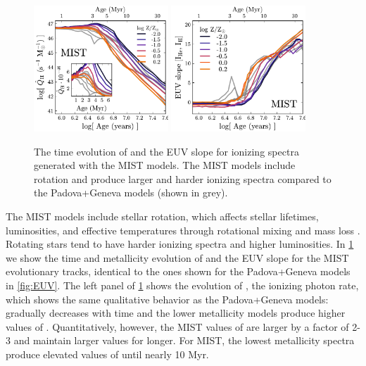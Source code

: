 \begin{figure}[!htbp]
  \begin{centering}
    \includegraphics[width=0.45\textwidth]{manuscript/chapter2/f23a.pdf}
    \includegraphics[width=0.45\textwidth]{manuscript/chapter2/f23b.pdf}
    \caption{The time evolution of \QHat{} and the EUV slope for ionizing spectra generated with the MIST models. The MIST models include rotation and produce larger \QH{} and harder ionizing spectra compared to the Padova+Geneva models (shown in grey).}
    \label{fig:Qmist}
  \end{centering}
\end{figure}

The MIST models include stellar rotation, which affects stellar lifetimes, luminosities, and effective temperatures through rotational mixing and mass loss \citep[][for further details]{Choi16}. Rotating stars tend to have harder ionizing spectra and higher luminosities. In \ref{fig:Qmist} we show the time and metallicity evolution of \QHat{} and the EUV slope for the MIST evolutionary tracks, identical to the ones shown for the Padova+Geneva models in \ref{fig:EUV}. The left panel of \ref{fig:Qmist} shows the evolution of \QHat{}, the ionizing photon rate, which shows the same qualitative behavior as the Padova+Geneva models: \QHat{} gradually decreases with time and the lower metallicity models produce higher values of \QHat{}. Quantitatively, however, the MIST values of \QHat{} are larger by a factor of 2-3 and maintain larger values for longer. For MIST, the lowest metallicity spectra produce elevated values of \QHat{} until nearly 10 Myr. 

